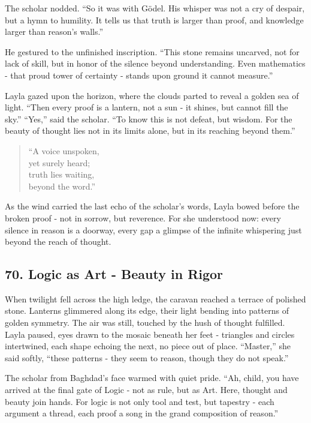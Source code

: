 \documentclass[
  letterpaper,
  DIV=11,
  numbers=noendperiod]{scrreprt}
\begin{document}
The scholar nodded. ``So it was with Gödel. His whisper was not a cry of
despair, but a hymn to humility. It tells us that truth is larger than
proof, and knowledge larger than reason's walls.''

He gestured to the unfinished inscription. ``This stone remains
uncarved, not for lack of skill, but in honor of the silence beyond
understanding. Even mathematics - that proud tower of certainty - stands
upon ground it cannot measure.''

Layla gazed upon the horizon, where the clouds parted to reveal a golden
sea of light. ``Then every proof is a lantern, not a sun - it shines,
but cannot fill the sky.'' ``Yes,'' said the scholar. ``To know this is
not defeat, but wisdom. For the beauty of thought lies not in its limits
alone, but in its reaching beyond them.''

\begin{quote}
``A voice unspoken,\\
yet surely heard;\\
truth lies waiting,\\
beyond the word.''
\end{quote}

As the wind carried the last echo of the scholar's words, Layla bowed
before the broken proof - not in sorrow, but reverence. For she
understood now: every silence in reason is a doorway, every gap a
glimpse of the infinite whispering just beyond the reach of thought.

\subsection{70. Logic as Art - Beauty in
Rigor}\label{logic-as-art---beauty-in-rigor}

When twilight fell across the high ledge, the caravan reached a terrace
of polished stone. Lanterns glimmered along its edge, their light
bending into patterns of golden symmetry. The air was still, touched by
the hush of thought fulfilled. Layla paused, eyes drawn to the mosaic
beneath her feet - triangles and circles intertwined, each shape echoing
the next, no piece out of place. ``Master,'' she said softly, ``these
patterns - they seem to reason, though they do not speak.''

The scholar from Baghdad's face warmed with quiet pride. ``Ah, child,
you have arrived at the final gate of Logic - not as rule, but as Art.
Here, thought and beauty join hands. For logic is not only tool and
test, but tapestry - each argument a thread, each proof a song in the
grand composition of reason.''
\end{document}
